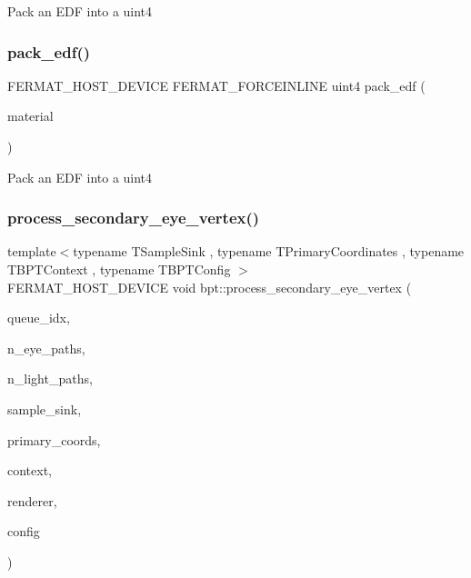 \begin{DoxyParagraph}{}
Pack an E\+DF into a uint4 
\end{DoxyParagraph}
\mbox{\label{group___b_p_t_lib_core_gad4aa7704b646405fd0a0465ac8408e9d}} 
\subsubsection{\texorpdfstring{pack\+\_\+edf()}{pack\_edf()}\hspace{0.1cm}{\footnotesize\ttfamily [2/2]}}
{\footnotesize\ttfamily F\+E\+R\+M\+A\+T\+\_\+\+H\+O\+S\+T\+\_\+\+D\+E\+V\+I\+CE F\+E\+R\+M\+A\+T\+\_\+\+F\+O\+R\+C\+E\+I\+N\+L\+I\+NE uint4 pack\+\_\+edf (\begin{DoxyParamCaption}\item[{const \hyperlink{struct_mesh_material}{Mesh\+Material} \&}]{material }\end{DoxyParamCaption})}

\begin{DoxyParagraph}{}
Pack an E\+DF into a uint4 
\end{DoxyParagraph}
\mbox{\label{group___b_p_t_lib_core_ga560956a804364f64f0cf35d2d0c07124}} 
\subsubsection{\texorpdfstring{process\+\_\+secondary\+\_\+eye\+\_\+vertex()}{process\_secondary\_eye\_vertex()}}
{\footnotesize\ttfamily template$<$typename T\+Sample\+Sink , typename T\+Primary\+Coordinates , typename T\+B\+P\+T\+Context , typename T\+B\+P\+T\+Config $>$ \\
F\+E\+R\+M\+A\+T\+\_\+\+H\+O\+S\+T\+\_\+\+D\+E\+V\+I\+CE void bpt\+::process\+\_\+secondary\+\_\+eye\+\_\+vertex (\begin{DoxyParamCaption}\item[{const uint32}]{queue\+\_\+idx,  }\item[{const uint32}]{n\+\_\+eye\+\_\+paths,  }\item[{const uint32}]{n\+\_\+light\+\_\+paths,  }\item[{T\+Sample\+Sink \&}]{sample\+\_\+sink,  }\item[{const T\+Primary\+Coordinates \&}]{primary\+\_\+coords,  }\item[{T\+B\+P\+T\+Context \&}]{context,  }\item[{\hyperlink{struct_rendering_context_view}{Rendering\+Context\+View} \&}]{renderer,  }\item[{T\+B\+P\+T\+Config \&}]{config }\end{DoxyParamCaption})}


